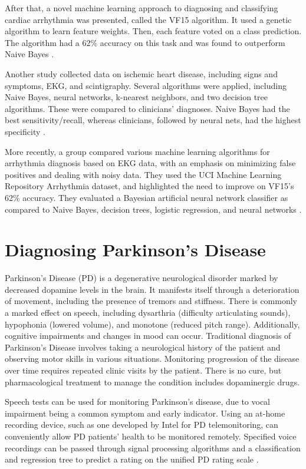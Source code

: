 \documentclass[draftcopy]{srpaper}
\begin{document}
After that, a novel machine learning approach to diagnosing and
classifying cardiac arrhythmia was presented, called the VF15
algorithm. It used a genetic algorithm to learn feature weights. Then,
each feature voted on a class prediction. The algorithm had a 62\%
accuracy on this task and was found to outperform Naive Bayes \cite{GAD98}.

Another study collected data on ischemic heart disease, including signs and
symptoms, EKG, and scintigraphy. Several algorithms were applied, including Naive Bayes, neural networks,
k-nearest neighbors, and two decision tree algorithms. These were compared to clinicians’ diagnoses. Naive Bayes had the best
sensitivity/recall, whereas clinicians, followed by neural nets, had
the highest specificity \cite{KKG+99}.

More recently, a group compared various machine learning algorithms for arrhythmia
diagnosis based on EKG data, with an emphasis on minimizing false
positives and dealing with noisy data. They used the UCI Machine
Learning Repository Arrhythmia dataset, and highlighted the need to
improve on VF15’s 62\% accuracy. They evaluated a Bayesian artificial neural network classifier as compared to Naive Bayes, decision trees, logistic regression, and neural networks \cite{GMCL05}.

\section{Diagnosing Parkinson's Disease}
Parkinson's Disease (PD) is a degenerative neurological disorder
marked by decreased dopamine levels in the brain. It manifests itself
through a deterioration of movement,
including the presence of tremors and stiffness. There is commonly a
marked effect on speech, including dysarthria (difficulty articulating
sounds), hypophonia (lowered volume), and monotone (reduced pitch
range). 
Additionally, 
cognitive impairments and changes in mood can occur.
Traditional diagnosis of Parkinson's Disease involves taking a
neurological history of the patient and observing motor skills in
various situations. Monitoring progression of the disease over time requires repeated clinic visits by the patient. There is no cure, but pharmacological treatment to
manage the condition includes dopaminergic drugs. 

Speech tests can be used for monitoring Parkinson’s disease, due to
vocal impairment being a common symptom and early indicator. Using an
at-home recording device, such as one developed by Intel for PD
telemonitoring, can conveniently allow PD patients' health to be monitored
remotely. Specified voice recordings can be passed through signal processing algorithms and a
classification and regression tree to predict a rating on the unified
PD rating scale \cite{TLMR10}.
\end{document}
